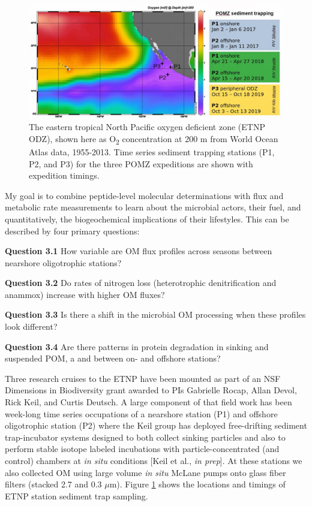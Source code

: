 \documentclass[12pt, letterpaper, twoside]{article}
\begin{document}
\bigskip

\begin{figure}
	\includegraphics[width=\linewidth]{pomz-sed-trap-sta.jpg}
	\caption{The eastern tropical North Pacific oxygen deficient zone (ETNP ODZ), shown here as O\textsubscript{2} concentration at 200 m from World Ocean Atlas data, 1955-2013. Time series sediment trapping stations (P1, P2, and P3) for the three POMZ expeditions are shown with expedition timings.}
	\label{fig:etnp map}
\end{figure}

My goal is to combine peptide-level molecular determinations with flux and metabolic rate measurements to learn about the microbial actors, their fuel, and quantitatively, the biogeochemical implications of their lifestyles. This can be described by four primary questions:

\bigskip

\textbf{Question 3.1} How variable are OM flux profiles across seasons between nearshore oligotrophic stations? 

\bigskip

\textbf{Question 3.2} Do rates of nitrogen loss (heterotrophic denitrification and anammox) increase with higher OM fluxes?

\bigskip

\textbf{Question 3.3} Is there a shift in the microbial OM processing when these profiles look different?

\bigskip

\textbf{Question 3.4} Are there patterns in protein degradation in sinking and suspended POM, a and between on- and offshore stations?

\bigskip

Three research cruises to the ETNP have been mounted as part of an NSF Dimensions in Biodiversity grant awarded to PIs Gabrielle Rocap, Allan Devol, Rick Keil, and Curtis Deutsch. A large component of that field work has been week-long time series occupations of a nearshore station (P1) and offshore oligotrophic station (P2) where the Keil group has deployed free-drifting sediment trap-incubator systems designed to both collect sinking particles and also to perform stable isotope labeled incubations with particle-concentrated (and control) chambers at \textit{in situ} conditions [Keil et al., \textit{in prep}]. At these stations we also collected OM using large volume \textit{in situ} McLane pumps onto glass fiber filters (stacked 2.7 and 0.3 $\mu$m). Figure \ref{fig:etnp map} shows the locations and timings of ETNP station sediment trap sampling.
\end{document}
